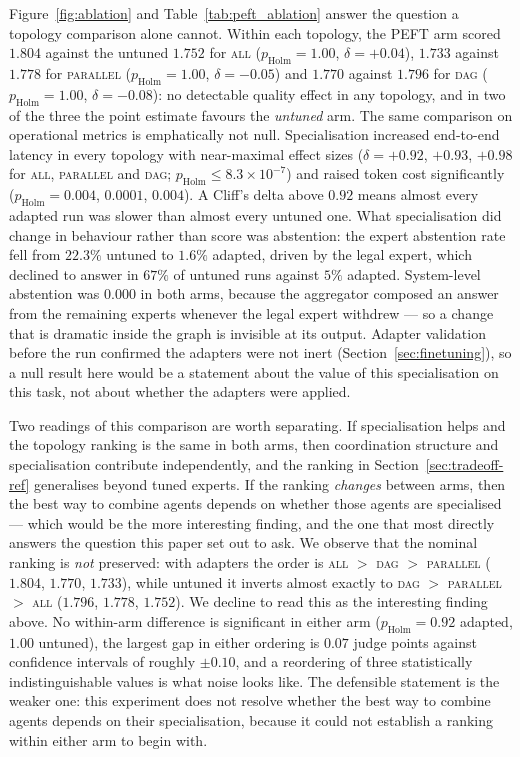\documentclass[journal,10pt,compsoc,onecolumn]{IEEEtran}
\begin{document}
Figure~\ref{fig:ablation} and Table~\ref{tab:peft_ablation} answer the question a
topology comparison alone cannot. Within each topology, the PEFT arm scored
$1.804$ against the untuned $1.752$ for \textsc{all}
($p_{\text{Holm}} = 1.00$, $\delta = +0.04$), $1.733$ against $1.778$ for
\textsc{parallel} ($p_{\text{Holm}} = 1.00$, $\delta = -0.05$) and $1.770$
against $1.796$ for \textsc{dag} ($p_{\text{Holm}} = 1.00$, $\delta = -0.08$):
no detectable quality effect in any topology, and in two of the three the point
estimate favours the \emph{untuned} arm. The same comparison on operational
metrics is emphatically not null. Specialisation increased end-to-end latency
in every topology with near-maximal effect sizes
($\delta = +0.92$, $+0.93$, $+0.98$ for \textsc{all}, \textsc{parallel} and
\textsc{dag}; $p_{\text{Holm}} \leq 8.3\times10^{-7}$) and raised token cost
significantly ($p_{\text{Holm}} = 0.004$, $0.0001$, $0.004$). A Cliff's delta
above $0.92$ means almost every adapted run was slower than almost every
untuned one. What specialisation did change in behaviour rather than score was
abstention: the expert abstention rate fell from $22.3\%$ untuned to $1.6\%$
adapted, driven by the legal expert, which declined to answer in $67\%$ of
untuned runs against $5\%$ adapted. System-level abstention was $0.000$ in both
arms, because the aggregator composed an answer from the remaining experts
whenever the legal expert withdrew --- so a change that is dramatic inside the
graph is invisible at its output.
Adapter validation before the run confirmed the adapters were not inert
(Section~\ref{sec:finetuning}), so a null result here would be a statement about
the value of this specialisation on this task, not about whether the adapters were
applied.

Two readings of this comparison are worth separating. If specialisation helps and
the topology ranking is the same in both arms, then coordination structure and
specialisation contribute independently, and the ranking in
Section~\ref{sec:tradeoff-ref} generalises beyond tuned experts. If the ranking
\emph{changes} between arms, then the best way to combine agents depends on
whether those agents are specialised --- which would be the more interesting
finding, and the one that most directly answers the question this paper set out
to ask. We observe that the nominal ranking is \emph{not} preserved: with
adapters the order is \textsc{all} $>$ \textsc{dag} $>$ \textsc{parallel}
($1.804$, $1.770$, $1.733$), while untuned it inverts almost exactly to
\textsc{dag} $>$ \textsc{parallel} $>$ \textsc{all} ($1.796$, $1.778$,
$1.752$). We decline to read this as the interesting finding above. No
within-arm difference is significant in either arm ($p_{\text{Holm}} = 0.92$
adapted, $1.00$ untuned), the largest gap in either ordering is $0.07$ judge
points against confidence intervals of roughly $\pm 0.10$, and a reordering of
three statistically indistinguishable values is what noise looks like. The
defensible statement is the weaker one: this experiment does not resolve
whether the best way to combine agents depends on their specialisation,
because it could not establish a ranking within either arm to begin with.
\end{document}
